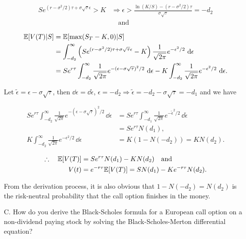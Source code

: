 \begin{solution}
\[
\begin{aligned}
Se^{(r-\sigma^2/2)\tau+\sigma\sqrt{\tau}\epsilon}>K
&\Rightarrow \epsilon>\frac{\ln(K/S)-(r-\sigma^2/2)\tau}{\sigma\sqrt{\tau}}=-d_2\\
&\quad\text{and}
\end{aligned}
\]

\[
\begin{aligned}
\mathbb{E}[V(T)\vert S]&=\mathbb{E}[\max(S_T-K,0)\vert S]\\
&=\int_{-d_2}^{\infty}\left(Se^{(r-\sigma^2/2)\tau+\sigma\sqrt{\tau}\epsilon}-K\right)
\frac{1}{\sqrt{2\pi}}e^{-\epsilon^2/2}\,\mathop{}\!\mathrm{d}\epsilon\\
&=Se^{r\tau}\int_{-d_2}^{\infty}\frac{1}{\sqrt{2\pi}}
e^{-(\epsilon-\sigma\sqrt{\tau})^2/2}\,\mathop{}\!\mathrm{d}\epsilon
-K\int_{-d_2}^{\infty}\frac{1}{\sqrt{2\pi}}e^{-\epsilon^2/2}\,\mathop{}\!\mathrm{d}\epsilon.
\end{aligned}
\]

Let $\tilde{\epsilon}=\epsilon-\sigma\sqrt{\tau}$, then
$\dd\epsilon=\dd\tilde{\epsilon}$, $\epsilon=-d_2\Rightarrow
\tilde{\epsilon}=-d_2-\sigma\sqrt{\tau}=-d_1$ and we have

\[
\begin{aligned}
Se^{r\tau}\int_{-d_2}^{\infty}\frac{1}{\sqrt{2\pi}}
e^{-(\epsilon-\sigma\sqrt{\tau})^2/2}\,\dd\epsilon
&=Se^{r\tau}\int_{-d_1}^{\infty}\frac{1}{\sqrt{2\pi}}e^{-\tilde{\epsilon}^2/2}\,\dd\tilde{\epsilon}\\
&=Se^{r\tau}N(d_1),\\
K\int_{-d_2}^{\infty}\frac{1}{\sqrt{2\pi}}e^{-\epsilon^2/2}\,\dd\epsilon
&=K\left(1-N(-d_2)\right)=KN(d_2).
\end{aligned}
\]

\[
\begin{aligned}
\therefore\quad \mathbb{E}[V(T)]&=Se^{r\tau}N(d_1)-KN(d_2)\quad\text{and}\quad\\
V(t)&=e^{-r\tau}\mathbb{E}[V(T)]=SN(d_1)-Ke^{-r\tau}N(d_2).
\end{aligned}
\]

From the derivation process, it is also obvious that $1-N(-d_2)=N(d_2)$ is the
risk-neutral probability that the call option finishes in the money.

\end{solution}

\begin{problem}{C. How do you derive the Black-Scholes formula for a European call option on a
non-dividend paying stock by solving the Black-Scholes-Merton differential equation?}
\end{problem}

